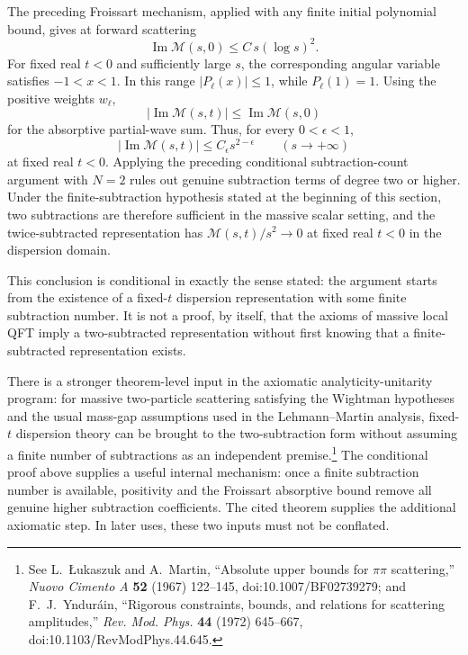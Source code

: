 The preceding Froissart mechanism, applied with any finite initial polynomial
bound, gives at forward scattering
\[
  \operatorname{Im}\mathcal M(s,0)
  \le
  C\,s(\log s)^2 .
\]
For fixed real \(t<0\) and sufficiently large \(s\), the corresponding angular
variable satisfies \(-1<x<1\).  In this range \(|P_\ell(x)|\le1\), while
\(P_\ell(1)=1\).  Using the positive weights \(w_\ell\),
\[
  |\operatorname{Im}\mathcal M(s,t)|
  \le
  \operatorname{Im}\mathcal M(s,0)
\]
for the absorptive partial-wave sum.  Thus, for every \(0<\epsilon<1\),
\[
  |\operatorname{Im}\mathcal M(s,t)|\le C_\epsilon s^{2-\epsilon}
  \qquad (s\to+\infty)
\]
at fixed real \(t<0\).  Applying the preceding conditional subtraction-count
argument with \(N=2\) rules out genuine subtraction terms of degree two or
higher.  Under the finite-subtraction hypothesis stated at the beginning of
this section, two subtractions are therefore sufficient in the massive scalar
setting, and the twice-subtracted representation has
\(\mathcal M(s,t)/s^2\to0\) at fixed real \(t<0\) in the dispersion domain.

This conclusion is conditional in exactly the sense stated: the argument
starts from the existence of a fixed-\(t\) dispersion representation with some
finite subtraction number.  It is not a proof, by itself, that the axioms of
massive local QFT imply a two-subtracted representation without first knowing
that a finite-subtracted representation exists.

\begin{remark}
There is a stronger theorem-level input in the axiomatic
analyticity-unitarity program: for massive two-particle scattering satisfying
the Wightman hypotheses and the usual mass-gap assumptions used in the
Lehmann--Martin analysis, fixed-\(t\) dispersion theory can be brought to the
two-subtraction form without assuming a finite number of subtractions as an
independent premise.\footnote{See L.~\L{}ukaszuk and A.~Martin, ``Absolute
upper bounds for \(\pi\pi\) scattering,'' \emph{Nuovo Cimento A} \textbf{52}
(1967) 122--145, doi:10.1007/BF02739279; and F.~J.~Yndur\'ain, ``Rigorous
constraints, bounds, and relations for scattering amplitudes,'' \emph{Rev.
Mod. Phys.} \textbf{44} (1972) 645--667, doi:10.1103/RevModPhys.44.645.}
The conditional proof above supplies a useful internal mechanism: once a
finite subtraction number is available, positivity and the Froissart
absorptive bound remove all genuine higher subtraction coefficients.  The
cited theorem supplies the additional axiomatic step.  In later uses, these
two inputs must not be conflated.
\end{remark}

